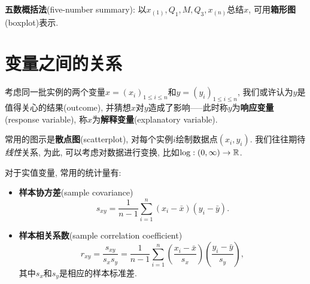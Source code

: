 \begin{definition}
      \textbf{五数概括法}(five-number summary): 以$x_{(1)},Q_{1},M,Q_{3},x_{(n)}$总结$x$, 可用\textbf{箱形图}(boxplot)表示.
\end{definition}

\section{变量之间的关系}
考虑同一批实例的两个变量$x = (x_{i})_{1\leq i\leq n}$和$y = (y_{i})_{1\leq i\leq n}$, 我们或许认为$y$是值得关心的结果(outcome), 并猜想$x$对$y$造成了影响-----此时称$y$为\textbf{响应变量}(response variable), 称$x$为\textbf{解释变量}(explanatory variable).

常用的图示是\textbf{散点图}(scatterplot), 对每个实例$i$绘制数据点$(x_{i},y_{i})$. 我们往往期待\emph{线性}关系, 为此, 可以考虑对数据进行变换, 比如$\log : (0,\infty) \to \mathbb{R}$.

对于实值变量, 常用的统计量有:
\begin{itemize}
      \item \textbf{样本协方差}(sample covariance)
            \[ s_{xy} = \frac{1}{n-1}\sum_{i=1}^{n}(x_{i}-\bar{x})(y_{i}-\bar{y}). \]
      \item \textbf{样本相关系数}(sample correlation coefficient)
            \[ r_{xy} = \frac{s_{xy}}{s_{x}s_{y}} = \frac{1}{n-1}\sum_{i=1}^{n}\left(\frac{x_{i}-\bar{x}}{s_{x}}\right)\left(\frac{y_{i}-\bar{y}}{s_{y}}\right), \]
            其中$s_{x}$和$s_{y}$是相应的样本标准差.
\end{itemize}


